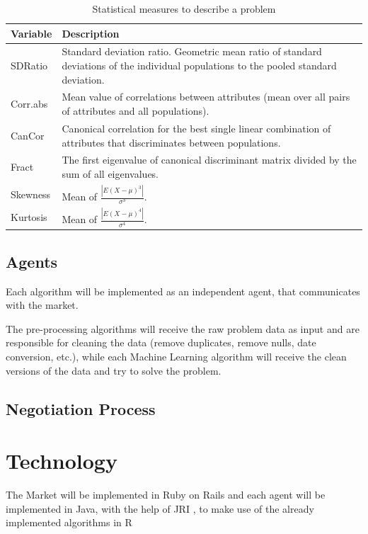 \documentclass{llncs}
\begin{document}
\begin{table}[h]
\centering
\begin{tabular}{l p{10cm}}
\textbf{Variable} & \textbf{Description} \\
\hline
SDRatio & Standard deviation ratio. Geometric mean ratio of standard deviations of the individual populations to the pooled standard deviation. \\ 
Corr.abs & Mean value of correlations between attributes (mean over all pairs of attributes and all populations). \\
CanCor & Canonical correlation for the best single linear combination of attributes that discriminates between populations. \\
Fract & The first eigenvalue of canonical discriminant matrix divided by the sum of all eigenvalues. \\
Skewness &  Mean of $ \frac{| E(X-\mu)^3 |}{\sigma^3}$.\\
Kurtosis &  Mean of $\frac{| E(X-\mu)^4 |} {\sigma^4}$.\\
\hline
\end{tabular}
\caption{Statistical measures to describe a problem}
\label{tab:stat}
\end{table}

\subsection{Agents}

Each algorithm will be implemented as an independent agent, that communicates with the market. 

The pre-processing algorithms will receive the raw problem data as input and are responsible for cleaning the data (remove duplicates, remove nulls, date conversion, etc.), while each Machine Learning algorithm will receive the clean versions of the data and try to solve the problem. 





\subsection{Negotiation Process}




\section{Technology}

The Market will be implemented in Ruby on Rails \cite{tec:RoR} and each agent will be implemented in Java, with the help of JRI \cite{tec:JRI}, to make use of the already implemented algorithms in R \cite{tec:R}
\end{document}
